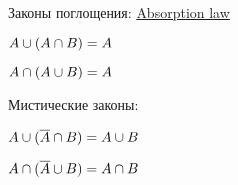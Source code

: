 \documentclass[a4paper,10pt]{article}
\begin{document}
\begin{multicols}{2}
\begin{terms}
    \item Законы поглощения:
    \hfill\href{https://en.wikipedia.org/wiki/Absorption_law}{Absorption law}
    \begin{terms}
        \item $A \cup (A \cap B) = A$
        \item $A \cap (A \cup B) = A$
    \end{terms}

    \item Мистические законы:
    \begin{terms}
        \item $A \cup (\overline{A} \cap B) = A \cup B$
        \item $A \cap (\overline{A} \cup B) = A \cap B$
    \end{terms}






\end{terms}
\end{multicols}
\end{document}

